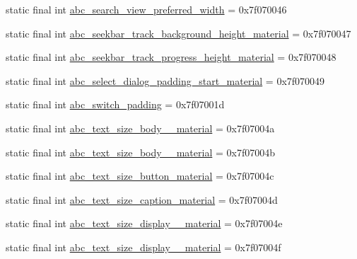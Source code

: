 \begin{CompactItemize}
\item 
static final int \hyperlink{classandroid_1_1support_1_1graphics_1_1drawable_1_1animated_1_1_r_1_1dimen_22bfbdafa67addfc2053387284def08f}{abc\_\-search\_\-view\_\-preferred\_\-width} = 0x7f070046
\item 
static final int \hyperlink{classandroid_1_1support_1_1graphics_1_1drawable_1_1animated_1_1_r_1_1dimen_380ef2762ab41265e93d7097348e2647}{abc\_\-seekbar\_\-track\_\-background\_\-height\_\-material} = 0x7f070047
\item 
static final int \hyperlink{classandroid_1_1support_1_1graphics_1_1drawable_1_1animated_1_1_r_1_1dimen_dd8b70796bb2f1bd280d9b88f4433cef}{abc\_\-seekbar\_\-track\_\-progress\_\-height\_\-material} = 0x7f070048
\item 
static final int \hyperlink{classandroid_1_1support_1_1graphics_1_1drawable_1_1animated_1_1_r_1_1dimen_59034515551e515a1632cd8decb34e1e}{abc\_\-select\_\-dialog\_\-padding\_\-start\_\-material} = 0x7f070049
\item 
static final int \hyperlink{classandroid_1_1support_1_1graphics_1_1drawable_1_1animated_1_1_r_1_1dimen_ec7a5538024e4fb9408c46673566a98b}{abc\_\-switch\_\-padding} = 0x7f07001d
\item 
static final int \hyperlink{classandroid_1_1support_1_1graphics_1_1drawable_1_1animated_1_1_r_1_1dimen_4dab2bb7bb3f95cc2bcdf1e675868d2f}{abc\_\-text\_\-size\_\-body\_\_\-material} = 0x7f07004a
\item 
static final int \hyperlink{classandroid_1_1support_1_1graphics_1_1drawable_1_1animated_1_1_r_1_1dimen_bf4b5d0049f4d063409cf762360cd37c}{abc\_\-text\_\-size\_\-body\_\_\-material} = 0x7f07004b
\item 
static final int \hyperlink{classandroid_1_1support_1_1graphics_1_1drawable_1_1animated_1_1_r_1_1dimen_feab13c9f19539bf29bb2f2d7d7fcba9}{abc\_\-text\_\-size\_\-button\_\-material} = 0x7f07004c
\item 
static final int \hyperlink{classandroid_1_1support_1_1graphics_1_1drawable_1_1animated_1_1_r_1_1dimen_31ad910c172a11fc00dbe16f5cb0c73d}{abc\_\-text\_\-size\_\-caption\_\-material} = 0x7f07004d
\item 
static final int \hyperlink{classandroid_1_1support_1_1graphics_1_1drawable_1_1animated_1_1_r_1_1dimen_04fd22183627528a5592897ffa65e6c7}{abc\_\-text\_\-size\_\-display\_\_\-material} = 0x7f07004e
\item 
static final int \hyperlink{classandroid_1_1support_1_1graphics_1_1drawable_1_1animated_1_1_r_1_1dimen_ee5e17f84f45bcb851f63cc4a3d5db29}{abc\_\-text\_\-size\_\-display\_\_\-material} = 0x7f07004f

\end{CompactItemize}
